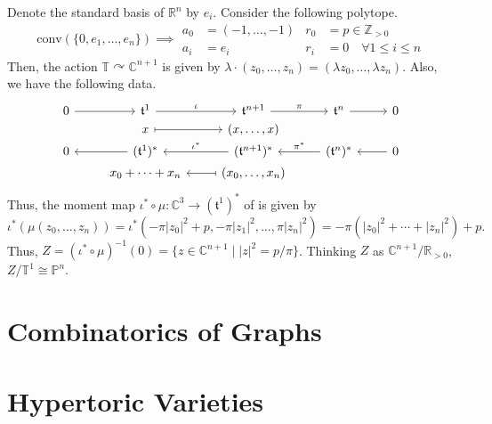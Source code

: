 \documentclass[b5paper]{article}
\newcommand{\acton}{\curvearrowright}
\begin{document}
\begin{example}{}
    Denote the standard basis of $\mathbb{R}^n$ by $e_i$. Consider the following polytope.
    \begin{equation*}
        \mathrm{conv}(\{ 0, e_1, \dots, e_n \})
        \implies
        \begin{aligned}
            a_0 &= (-1, \dots, -1) & r_0 &= p \in \mathbb{Z}_{>0} \\
            a_i &= e_i & r_i &= 0 \quad \forall 1 \leq i \leq n
        \end{aligned}
    \end{equation*}
    Then, the action $\mathbb{T} \acton \mathbb{C}^{n+1}$ is given by $\lambda \cdot (z_0, \dots, z_n) = (\lambda z_0, \dots, \lambda z_n)$. Also, we have the following data.
    \begin{equation*}
        \begin{tikzcd}[row sep=0ex]
            0 \arrow[r] & \mathfrak{t}^1 \arrow[r, "\iota"] & \mathfrak{t}^{n+1} \arrow[r, "\pi"] & \mathfrak{t}^n \arrow[r] & 0 \\
            {} & x \arrow[r, maps to] & (x, \dots, x) & {} & {} \\
            0 & (\mathfrak{t}^1)^* \arrow[l] & (\mathfrak{t}^{n+1})^* \arrow[l, "\iota^*"'] & (\mathfrak{t}^n)^* \arrow[l, "\pi^*"'] & 0 \arrow[l] \\
            {} & x_0 + \cdots + x_n & (x_0, \dots, x_n) \arrow[l, maps to] & {} & {}
        \end{tikzcd}
    \end{equation*}
    Thus, the moment map $\iota^* \circ \mu : \mathbb{C}^3 \to (\mathfrak{t}^1)^*$ of is given by
    \begin{equation*}
        \iota^*(\mu(z_0, \dots, z_n)) = \iota^*(-\pi|z_0|^2+p, -\pi|z_1|^2, \dots, \pi|z_n|^2) = -\pi(|z_0|^2+\cdots+|z_n|^2) + p.
    \end{equation*}
    Thus, $Z = (\iota^* \circ \mu)^{-1}(0) = \{ z \in \mathbb{C}^{n+1} \mid |z|^2 = p/\pi \}$. Thinking $Z$ as $\mathbb{C}^{n+1} / \mathbb{R}_{>0}$, $Z/\mathbb{T}^1 \cong \mathbb{P}^n$.
\end{example}
\section{Combinatorics of Graphs}

\section{Hypertoric Varieties}
\end{document}

